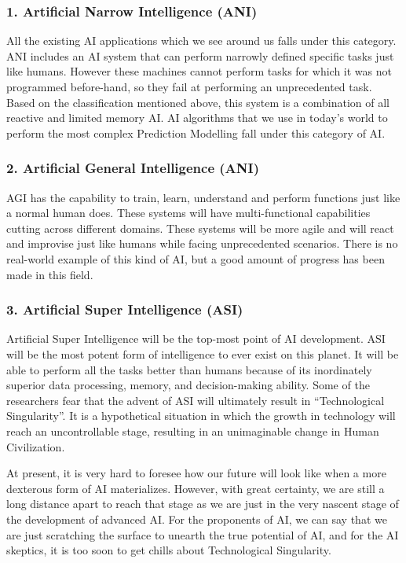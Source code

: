 \subsubsection{1. Artificial Narrow Intelligence (ANI)}

All the existing AI applications which we see around us falls under this category. 
ANI includes an AI system that can perform narrowly defined specific tasks just like 
humans. However these machines cannot perform tasks for which it was not programmed 
before-hand, so they fail at performing an unprecedented task. Based on the 
classification mentioned above, this system is a combination of all reactive and 
limited memory AI. AI algorithms that we use in today's world to perform the most 
complex Prediction Modelling fall under this category of AI.


\subsubsection{2. Artificial General Intelligence (ANI)}

AGI has the capability to train, learn, understand and perform functions just like 
a normal human does. These systems will have multi-functional capabilities cutting 
across different domains. These systems will be more agile and will react and 
improvise just like humans while facing unprecedented scenarios. There is no 
real-world example of this kind of AI, but a good amount of progress has been made 
in this field.


\subsubsection{3. Artificial Super Intelligence (ASI)}

Artificial Super Intelligence will be the top-most point of AI development. ASI 
will be the most potent form of intelligence to ever exist on this planet. It will 
be able to perform all the tasks better than humans because of its inordinately 
superior data processing, memory, and decision-making ability. Some of the 
researchers fear that the advent of ASI will ultimately result in “Technological 
Singularity”. It is a hypothetical situation in which the growth in technology will 
reach an uncontrollable stage, resulting in an unimaginable change in Human 
Civilization.

At present, it is very hard to foresee how our future will look like when a more 
dexterous form of AI materializes. However, with great certainty, we are still a 
long distance apart to reach that stage as we are just in the very nascent stage 
of the development of advanced AI. For the proponents of AI, we can say that we 
are just scratching the surface to unearth the true potential of AI, and for the 
AI skeptics, it is too soon to get chills about Technological Singularity.


